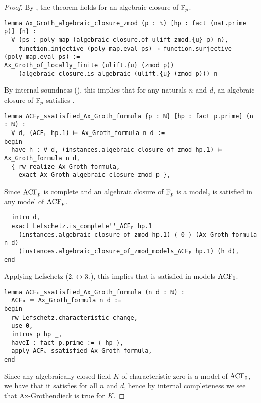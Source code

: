 \begin{proof}
By ,
the theorem holds for an algebraic closure of $\mathbb{F}_{p}$.
\begin{lstlisting}
lemma Ax_Groth_algebraic_closure_zmod (p : ℕ) [hp : fact (nat.prime p)] {n} :
  ∀ (ps : poly_map (algebraic_closure.of_ulift_zmod.{u} p) n),
    function.injective (poly_map.eval ps) → function.surjective (poly_map.eval ps) :=
Ax_Groth_of_locally_finite (ulift.{u} (zmod p))
    (algebraic_closure.is_algebraic (ulift.{u} (zmod p))) n \end{lstlisting}

By internal soundness (),
this implies that for any naturals $n$ and $d$,
an algebraic closure of $\mathbb{F}_{p}$ satisfies .

\begin{lstlisting}
lemma ACFₚ_ssatisfied_Ax_Groth_formula {p : ℕ} [hp : fact p.prime] (n : ℕ) :
  ∀ d, (ACFₚ hp.1) ⊨ Ax_Groth_formula n d :=
begin
  have h : ∀ d, (instances.algebraic_closure_of_zmod hp.1) ⊨ Ax_Groth_formula n d,
  { rw realize_Ax_Groth_formula,
    exact Ax_Groth_algebraic_closure_zmod p }, \end{lstlisting}

Since $\operatorname{ACF}_{p}$ is complete and an algebraic closure of $\mathbb{F}_{p}$ is a model,
 is satisfied in any model of $\operatorname{ACF}_{p}$.

\begin{lstlisting}
  intro d,
  exact Lefschetz.is_complete''_ACFₚ hp.1
    (instances.algebraic_closure_of_zmod hp.1) ⟨ 0 ⟩ (Ax_Groth_formula n d)
    (instances.algebraic_closure_of_zmod_models_ACFₚ hp.1) (h d),
end \end{lstlisting}

Applying Lefschetz ($2. \leftrightarrow 3.$), this implies that 
is satisfied in models $\operatorname{ACF}_{0}$.

\begin{lstlisting}
lemma ACF₀_ssatisfied_Ax_Groth_formula (n d : ℕ) :
  ACF₀ ⊨ Ax_Groth_formula n d :=
begin
  rw Lefschetz.characteristic_change,
  use 0,
  intros p hp _,
  haveI : fact p.prime := ⟨ hp ⟩,
  apply ACFₚ_ssatisfied_Ax_Groth_formula,
end \end{lstlisting}

Since any algebraically closed field $K$ of characteristic zero is a model of $\operatorname{ACF}_{0}$,
we have that it satisfies  for all $n$ and $d$,
hence by internal completeness we see that Ax-Grothendieck is true for $K$.


\end{proof}
